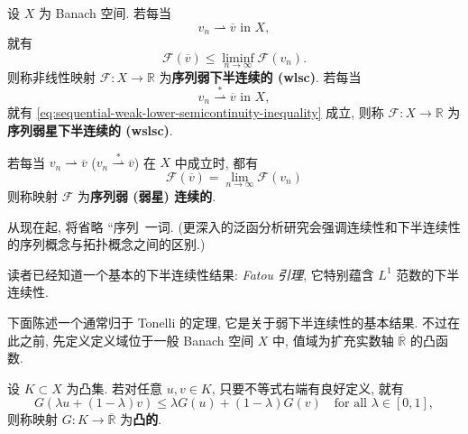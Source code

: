 \begin{Definition}
\label{def:sequential-weak-semicontinuity-and-continuity}
设 $X$ 为 Banach 空间. 若每当
\begin{equation}\label{eq:sequential-weak-lower-semicontinuity-sequence}
v_n\rightharpoonup\overline v\text{ in }X,
\end{equation}
就有
\begin{equation}\label{eq:sequential-weak-lower-semicontinuity-inequality}
\mathcal{F}(\overline v)\leq\liminf_{n\to\infty}\mathcal{F}(v_n).
\end{equation}
则称非线性映射 $\mathcal{F}:X\to\mathbb{R}$ 为\textbf{序列弱下半连续的 (wlsc)}. 若每当
\begin{equation}\label{eq:sequential-weak-star-lower-semicontinuity-sequence}
v_n\overset{*}{\rightharpoonup}\overline v\text{ in }X,
\end{equation}
就有 \eqref{eq:sequential-weak-lower-semicontinuity-inequality} 成立, 则称 $\mathcal{F}:X\to\mathbb{R}$ 为\textbf{序列弱星下半连续的 (wslsc)}.

若每当 $v_n\rightharpoonup\overline v$ ($v_n\overset{*}{\rightharpoonup}\overline v$) 在 $X$ 中成立时, 都有
\begin{equation}\label{eq:sequential-weak-continuity-functional-limit}
\mathcal{F}(\overline v)=\lim_{n\to\infty}\mathcal{F}(v_n)
\end{equation}
则称映射 $\mathcal{F}$ 为\textbf{序列弱 (弱星) 连续的}.
\end{Definition}

\begin{Remark}
\label{rem:sequential-semicontinuity-terminology-omission}
从现在起, 将省略 ``序列\textquotesingle\textquotesingle\ 一词. (更深入的泛函分析研究会强调连续性和下半连续性的序列概念与拓扑概念之间的区别.)
\end{Remark}

\begin{Remark}
\label{rem:fatou-lone-norm-lower-semicontinuity}
读者已经知道一个基本的下半连续性结果: \emph{Fatou 引理}, 它特别蕴含 $L^1$ 范数的下半连续性.
\end{Remark}

下面陈述一个通常归于 Tonelli 的定理, 它是关于弱下半连续性的基本结果. 不过在此之前, 先定义定义域位于一般 Banach 空间 $X$ 中, 值域为扩充实数轴 $\overline{\mathbb{R}}$ 的凸函数.

\begin{Definition}
\label{def:extended-real-convex-function}
设 $K\subset X$ 为凸集. 若对任意 $u,v\in K$, 只要不等式右端有良好定义, 就有
\begin{equation}\label{eq:extended-real-convex-function-definition}
G(\lambda u+(1-\lambda)v)\leq\lambda G(u)+(1-\lambda)G(v)\quad\text{for all }\lambda\in[0,1],
\end{equation}
则称映射 $G:K\to\overline{\mathbb{R}}$ 为\textbf{凸的}.
\end{Definition}

